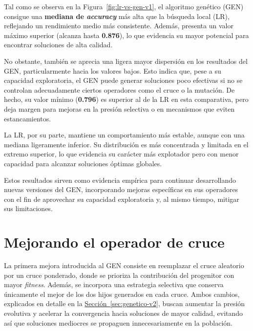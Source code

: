 Tal como se observa en la Figura~\ref{fig:lr-vs-gen-v1}, el algoritmo genético (GEN) consigue una \textbf{mediana de \textit{accuracy}} más alta que la búsqueda local (LR),
reflejando un rendimiento medio más consistente.
Además, presenta un valor máximo superior (alcanza hasta \textbf{0.876}), lo que evidencia su mayor potencial para encontrar soluciones de alta calidad.

No obstante, también se aprecia una ligera mayor dispersión en los resultados del GEN, particularmente hacia los valores bajos.
Esto indica que, pese a su capacidad exploratoria, el GEN puede generar soluciones poco efectivas si no se controlan adecuadamente ciertos operadores como el cruce o la mutación.
De hecho, su valor mínimo (\textbf{0.796}) es superior al de la LR en esta comparativa,
pero deja margen para mejoras en la presión selectiva o en mecanismos que eviten estancamientos.

La LR, por su parte, mantiene un comportamiento más estable, aunque con una mediana ligeramente inferior.
Su distribución es más concentrada y limitada en el extremo superior, lo que evidencia su carácter más explotador pero con menor capacidad para alcanzar soluciones óptimas globales.

Estos resultados sirven como evidencia empírica para continuar desarrollando nuevas versiones del GEN,
incorporando mejoras específicas en sus operadores con el fin de aprovechar su capacidad exploratoria y, al mismo tiempo, mitigar sus limitaciones.

\section{Mejorando el operador de cruce}\label{sec:incorporacion-cruce}
La primera mejora introducida al GEN consiste en reemplazar el cruce aleatorio por un cruce ponderado,
donde se prioriza la contribución del progenitor con mayor \textit{fitness}.
Además, se incorpora una estrategia selectiva que conserva únicamente el mejor de los dos hijos generados en cada cruce.
Ambos cambios, explicados en detalle en la \hyperref[sec:genetico-v2]{Sección~\ref*{sec:genetico-v2}},
buscan aumentar la presión evolutiva y acelerar la convergencia hacia soluciones de mayor calidad,
evitando así que soluciones mediocres se propaguen innecesariamente en la población.

